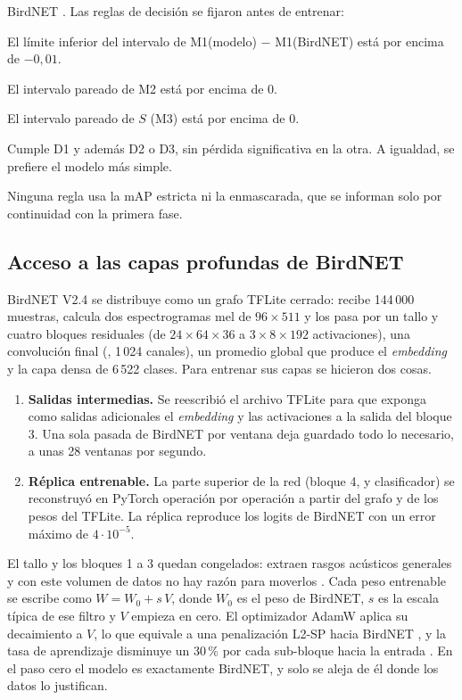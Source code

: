 BirdNET \citep{efron1993bootstrap}. Las reglas de decisión se fijaron antes de entrenar:
\begin{description}[leftmargin=1em]
  \item[D1, seguro.] El límite inferior del intervalo de M1(modelo) $-$ M1(BirdNET) está por encima de $-0{,}01$.
  \item[D2, mejor descartando falsos positivos.] El intervalo pareado de M2 está por encima de 0.
  \item[D3, más robusto a la pérdida de señal.] El intervalo pareado de $S$ (M3) está por encima de 0.
  \item[D4, exportable.] Cumple D1 y además D2 o D3, sin pérdida significativa en la otra. A igualdad, se prefiere el modelo más simple.
\end{description}
Ninguna regla usa la mAP estricta ni la enmascarada, que se informan solo por continuidad con la primera fase.

\subsection{Acceso a las capas profundas de BirdNET}\label{sec:capas}
BirdNET V2.4 se distribuye como un grafo TFLite cerrado: recibe 144\,000 muestras, calcula dos espectrogramas mel de $96 \times 511$ y los
pasa por un tallo y cuatro bloques residuales (de $24 \times 64 \times 36$ a $3 \times 8 \times 192$ activaciones), una convolución final
(, 1\,024 canales), un promedio global que produce el \emph{embedding} y la capa densa de 6\,522 clases. Para entrenar sus capas
se hicieron dos cosas.
\begin{enumerate}
  \item \textbf{Salidas intermedias.} Se reescribió el archivo TFLite para que exponga como salidas adicionales el \emph{embedding} y las
        activaciones a la salida del bloque 3. Una sola pasada de BirdNET por ventana deja guardado todo lo necesario, a unas 28 ventanas por segundo.
  \item \textbf{Réplica entrenable.} La parte superior de la red (bloque 4,  y clasificador) se reconstruyó en PyTorch operación por
        operación a partir del grafo y de los pesos del TFLite. La réplica reproduce los logits de BirdNET con un error máximo de $4\cdot 10^{-5}$.
\end{enumerate}
El tallo y los bloques 1 a 3 quedan congelados: extraen rasgos acústicos generales y con este volumen de datos no hay razón para moverlos
\citep{yosinski2014transferable}. Cada peso entrenable se escribe como $W = W_0 + s\,V$, donde $W_0$ es el peso de BirdNET, $s$ es la escala
típica de ese filtro y $V$ empieza en cero. El optimizador AdamW aplica su decaimiento a $V$, lo que equivale a una penalización L2-SP hacia
BirdNET \citep{li2018l2sp,loshchilov2019adamw}, y la tasa de aprendizaje disminuye un 30\,\% por cada sub-bloque hacia la entrada
\citep{howard2018ulmfit}. En el paso cero el modelo es exactamente BirdNET, y solo se aleja de él donde los datos lo justifican.

